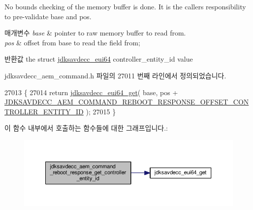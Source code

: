 No bounds checking of the memory buffer is done. It is the caller\textquotesingle{}s responsibility to pre-\/validate base and pos.


\begin{DoxyParams}{매개변수}
{\em base} & pointer to raw memory buffer to read from. \\
\hline
{\em pos} & offset from base to read the field from; \\
\hline
\end{DoxyParams}
\begin{DoxyReturn}{반환값}
the struct \hyperlink{structjdksavdecc__eui64}{jdksavdecc\+\_\+eui64} controller\+\_\+entity\+\_\+id value 
\end{DoxyReturn}


jdksavdecc\+\_\+aem\+\_\+command.\+h 파일의 27011 번째 라인에서 정의되었습니다.


\begin{DoxyCode}
27013 \{
27014     \textcolor{keywordflow}{return} \hyperlink{group__eui64_ga2652311a25a6b91cddbed75c108c7031}{jdksavdecc\_eui64\_get}( base, pos + 
      \hyperlink{group__command__reboot__response_ga68724f183e2c6483cc52e6d6253a0837}{JDKSAVDECC\_AEM\_COMMAND\_REBOOT\_RESPONSE\_OFFSET\_CONTROLLER\_ENTITY\_ID}
       );
27015 \}
\end{DoxyCode}


이 함수 내부에서 호출하는 함수들에 대한 그래프입니다.\+:
\nopagebreak
\begin{figure}[H]
\begin{center}
\leavevmode
\includegraphics[width=350pt]{group__command__reboot__response_gaa26cd76677d4919421c25666eefb5e18_cgraph}
\end{center}
\end{figure}


